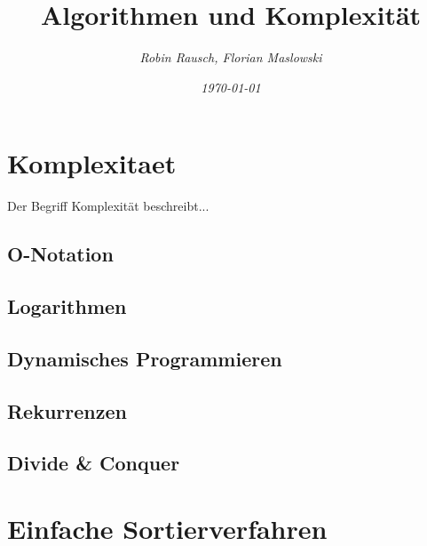 \documentclass[12pt,a4paper]{article}
\author{\slshape Robin Rausch, Florian Maslowski}
\title{Algorithmen und Komplexität}
\date{\slshape \today}
\begin{document}
\maketitle
\tableofcontents
\newpage
\section{Komplexitaet}
Der Begriff Komplexität beschreibt...
\subsection{O-Notation}

\subsection{Logarithmen}

\subsection{Dynamisches Programmieren}

\subsection{Rekurrenzen}

\subsection{Divide \& Conquer}

\section{Einfache Sortierverfahren}
\end{document}
